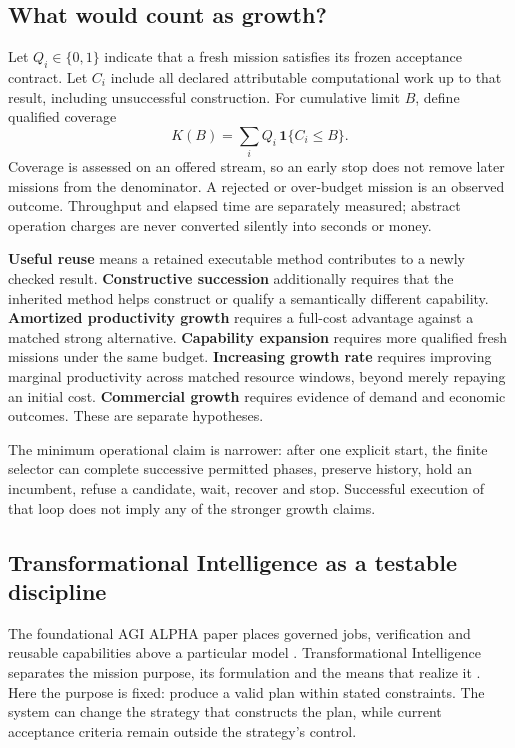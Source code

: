 \subsection{What would count as growth?}

Let $Q_i\in\{0,1\}$ indicate that a fresh mission satisfies its frozen acceptance contract. Let $C_i$ include all declared attributable computational work up to that result, including unsuccessful construction. For cumulative limit $B$, define qualified coverage
\begin{equation}
 K(B)=\sum_i Q_i\,\mathbf{1}\{C_i\leq B\}.
\end{equation}
Coverage is assessed on an offered stream, so an early stop does not remove later missions from the denominator. A rejected or over-budget mission is an observed outcome. Throughput and elapsed time are separately measured; abstract operation charges are never converted silently into seconds or money.

\textbf{Useful reuse} means a retained executable method contributes to a newly checked result. \textbf{Constructive succession} additionally requires that the inherited method helps construct or qualify a semantically different capability. \textbf{Amortized productivity growth} requires a full-cost advantage against a matched strong alternative. \textbf{Capability expansion} requires more qualified fresh missions under the same budget. \textbf{Increasing growth rate} requires improving marginal productivity across matched resource windows, beyond merely repaying an initial cost. \textbf{Commercial growth} requires evidence of demand and economic outcomes. These are separate hypotheses.

The minimum operational claim is narrower: after one explicit start, the finite selector can complete successive permitted phases, preserve history, hold an incumbent, refuse a candidate, wait, recover and stop. Successful execution of that loop does not imply any of the stronger growth claims.

\subsection{Transformational Intelligence as a testable discipline}

The foundational AGI ALPHA paper places governed jobs, verification and reusable capabilities above a particular model \citep{boucher2026agialpha}. Transformational Intelligence separates the mission purpose, its formulation and the means that realize it \citep{boucher2026transformational}. Here the purpose is fixed: produce a valid plan within stated constraints. The system can change the strategy that constructs the plan, while current acceptance criteria remain outside the strategy's control.

